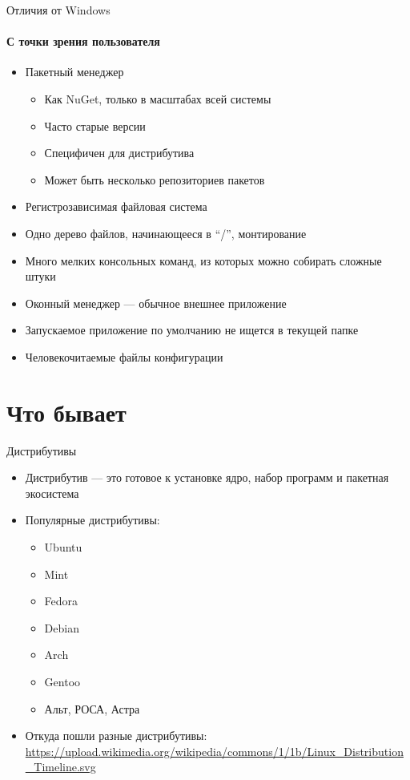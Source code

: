 \documentclass{../../slides-style}
\begin{document}
    \begin{frame}{Отличия от Windows}
        \framesubtitle{С точки зрения пользователя}
        \begin{itemize}
            \item Пакетный менеджер
            \begin{itemize}
                \item Как NuGet, только в масштабах всей системы
                \item Часто старые версии
                \item Специфичен для дистрибутива
                \item Может быть несколько репозиториев пакетов
            \end{itemize}
            \item Регистрозависимая файловая система
            \item Одно дерево файлов, начинающееся в \enquote{/}, монтирование
            \item Много мелких консольных команд, из которых можно собирать сложные штуки
            \item Оконный менеджер --- обычное внешнее приложение
            \item Запускаемое приложение по умолчанию не ищется в текущей папке
            \item Человекочитаемые файлы конфигурации
        \end{itemize}
    \end{frame}

    \section{Что бывает}

    \begin{frame}{Дистрибутивы}
        \begin{itemize}
            \item Дистрибутив --- это готовое к установке ядро, набор программ и пакетная экосистема
            \item Популярные дистрибутивы:
            \begin{itemize}
                \item Ubuntu
                \item Mint
                \item Fedora
                \item Debian
                \item Arch
                \item Gentoo
                \item Альт, РОСА, Астра
            \end{itemize}
            \item Откуда пошли разные дистрибутивы: \url{https://upload.wikimedia.org/wikipedia/commons/1/1b/Linux_Distribution_Timeline.svg}
        \end{itemize}
    \end{frame}
\end{document}
